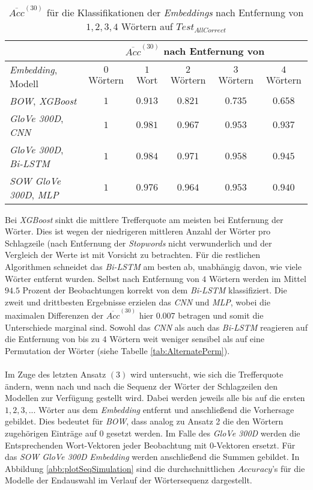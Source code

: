 \documentclass[a4paper,11pt]{article}
\begin{document}
\begin{table}[ht]
\centering
\begin{tabular}{|l||c|c|c|c|c|}
  \hline
  &  \multicolumn{5}{|c|}{$\overline{Acc}^{(30)}$ nach Entfernung von} \\
  \hline
  \textit{Embedding}, Modell & $0$ Wörtern & $1$ Wort & $2$ Wörtern & $3$ Wörtern & $4$ Wörtern \\
  \hline
   \textit{BOW}, \textit{XGBoost} & $1$ & $0.913$ &  $0.821$ & $0.735$ & $0.658$ \\
   \textit{GloVe 300D}, \textit{CNN} & $1$  & $0.981$ & $0.967$ & $0.953$ & $0.937$ \\
    \textit{GloVe 300D}, \textit{Bi-LSTM} & $1$ & $0.984$ & $0.971$ & $0.958$ & $0.945$ \\
     \textit{SOW GloVe 300D}, \textit{MLP} & $1$  & $0.976$ & $ 0.964$ & $0.953$ & $0.940$\\
     \hline
  
\end{tabular}
\caption{$\overline{Acc}^{(30)}$ für die Klassifikationen der \textit{Embeddings} nach Entfernung von $1,2,3,4$ Wörtern auf $Test_{AllCorrect}$}
\label{tab:AlternateRem}
\end{table}

Bei \textit{XGBoost} sinkt die mittlere Trefferquote am meisten bei Entfernung der Wörter. Dies ist wegen der niedrigeren mittleren Anzahl der Wörter pro Schlagzeile (nach Entfernung der \textit{Stopwords} nicht verwunderlich und der Vergleich der Werte ist mit Vorsicht zu betrachten. Für die restlichen Algorithmen schneidet das \textit{Bi-LSTM} am besten ab, unabhängig davon, wie viele Wörter entfernt wurden. Selbst nach Entfernung von $4$ Wörtern werden im Mittel $94.5$ Prozent der Beobachtungen korrekt von dem \textit{Bi-LSTM} klassifiziert. Die zweit und drittbesten Ergebnisse erzielen das \textit{CNN} und \textit{MLP}, wobei die maximalen Differenzen der $\overline{Acc}^{(30)}$ hier $0.007$ betragen und somit die Unterschiede marginal sind. Sowohl das \textit{CNN} als auch das \textit{Bi-LSTM} reagieren auf die Entfernung von bis zu $4$ Wörtern weit weniger sensibel als auf eine Permutation der Wörter (siehe Tabelle \ref{tab:AlternatePerm}).\\
\\
Im Zuge des letzten Ansatz $(3)$ wird untersucht, wie sich die Trefferquote ändern, wenn nach und nach die Sequenz der Wörter der Schlagzeilen den Modellen zur Verfügung gestellt wird. Dabei werden jeweils alle bis auf die ersten $1, 2, 3, ...$ Wörter aus dem \textit{Embedding} entfernt und anschließend die Vorhersage gebildet. Dies bedeutet für \textit{BOW}, dass analog zu Ansatz 2 die den Wörtern zugehörigen Einträge auf $0$ gesetzt werden. Im Falle des \textit{GloVe 300D} werden die Entsprechenden Wort-Vektoren jeder Beobachtung mit $0$-Vektoren ersetzt. Für das \textit{SOW GloVe 300D} \textit{Embedding} werden anschließend die Summen gebildet. In Abbildung \ref{abb:plotSeqSimulation} sind die durchschnittlichen $Accuracy$'s für die Modelle der Endauswahl im Verlauf der Wörtersequenz dargestellt.
\end{document}
